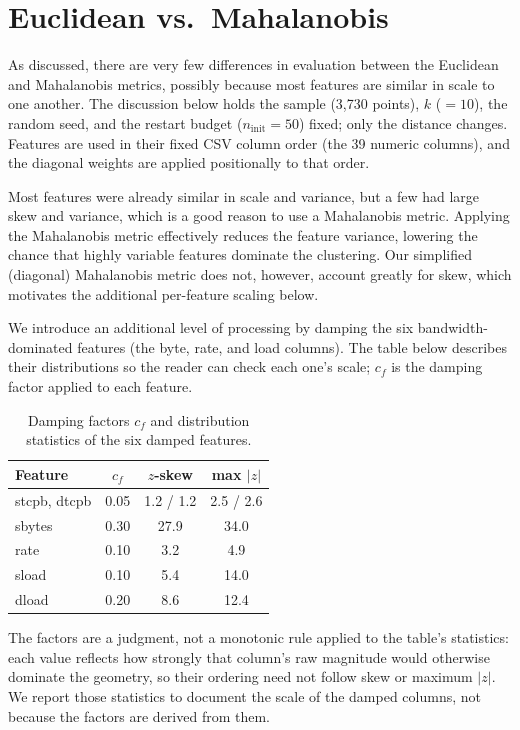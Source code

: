 \section{Euclidean vs.\ Mahalanobis}\label{sec:eucl-mahal}
As discussed, there are very few differences in evaluation between the
Euclidean and Mahalanobis metrics, possibly because most features are similar in
scale to one another. The discussion below holds the sample (3{,}730 points),
$k$ ($=10$), the random seed, and the restart budget ($n_{\mathrm{init}}=50$)
fixed; only the distance changes. Features are used in their fixed CSV column
order (the 39 numeric columns), and the diagonal weights are applied positionally
to that order.

Most features were already similar in scale and variance, but a few had large
skew and variance, which is a good reason to use a Mahalanobis metric. Applying
the Mahalanobis metric effectively reduces the feature variance, lowering the
chance that highly variable features dominate the clustering. Our simplified
(diagonal) Mahalanobis metric does not, however, account greatly for skew, which
motivates the additional per-feature scaling below.

We introduce an additional level of processing by damping the six
bandwidth-dominated features (the byte, rate, and load columns). The table below
describes their distributions so the reader can check each one's scale; $c_f$ is
the damping factor applied to each feature.
\begin{table}[t]
  \centering
  \caption{Damping factors $c_f$ and distribution statistics of the six damped features.}
  \begin{tabular}{lccc}
    \toprule
    Feature & $c_f$ & $z$-skew & max $|z|$ \\
    \midrule
    stcpb, dtcpb & 0.05 & 1.2 / 1.2 & 2.5 / 2.6 \\
    sbytes & 0.30 & 27.9 & 34.0 \\
    rate & 0.10 & 3.2 & 4.9 \\
    sload & 0.10 & 5.4 & 14.0 \\
    dload & 0.20 & 8.6 & 12.4 \\
    \bottomrule
  \end{tabular}
\end{table}

The factors are a judgment, not a monotonic rule applied to the table's
statistics: each value reflects how strongly that column's raw magnitude would
otherwise dominate the geometry, so their ordering need not follow skew or
maximum $|z|$. We report those statistics to document the scale of the damped
columns, not because the factors are derived from them.

